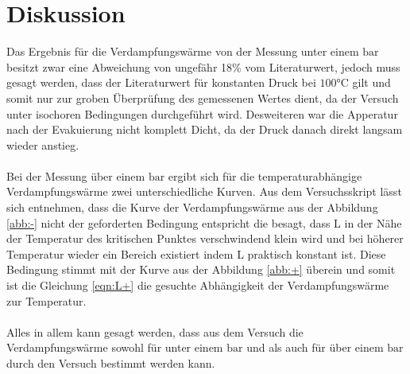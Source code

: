 \section{Diskussion}
\label{sec:Diskussion}
Das Ergebnis für die Verdampfungswärme von
der Messung unter einem $\si{\bar}$ besitzt
zwar eine Abweichung von ungefähr
18\% vom Literaturwert, jedoch muss gesagt werden, dass
der Literaturwert für konstanten Druck bei $100\si{\degreeCelsius}$
gilt und somit nur zur groben Überprüfung des gemessenen Wertes dient,
da der Versuch unter isochoren Bedingungen durchgeführt wird.
Desweiteren war die Apperatur nach der Evakuierung nicht komplett Dicht,
da der Druck danach direkt langsam wieder anstieg.\\
\\
Bei der Messung über einem $\si{\bar}$ ergibt sich für die
temperaturabhängige Verdampfungswärme zwei unterschiedliche
Kurven. Aus dem Versuchsskript\cite{sample} lässt sich entnehmen, dass
die Kurve der Verdampfungswärme aus der Abbildung \ref{abb:-} nicht der
geforderten Bedingung entspricht die besagt, dass  L in der Nähe der
Temperatur des kritischen Punktes verschwindend klein wird und bei höherer
Temperatur wieder ein Bereich existiert indem L praktisch konstant ist.
Diese Bedingung stimmt mit der Kurve aus der Abbildung \ref{abb:+} überein
und  somit ist die Gleichung \eqref{eqn:L+}
die gesuchte Abhängigkeit der Verdampfungswärme zur Temperatur.\\
\\
Alles in allem kann gesagt werden, dass aus dem Versuch die Verdampfungswärme
sowohl für unter einem $\si{\bar}$ und als auch für über einem $\si{\bar}$
durch den Versuch bestimmt werden kann.
